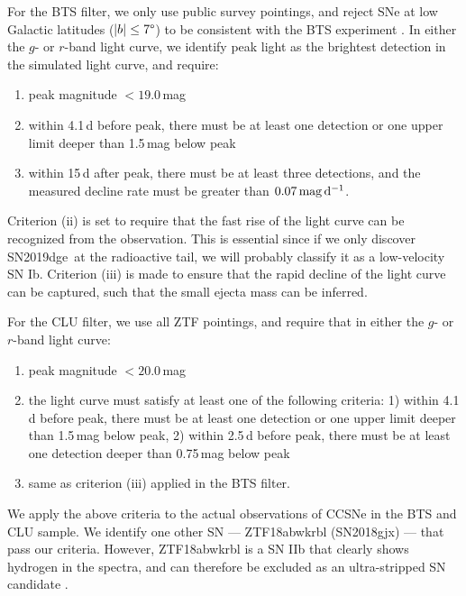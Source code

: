 \documentclass[twocolumn]{aastex63}
\newcommand{\name}{SN2019dge}
\begin{document}
\begin{CJK*}{UTF8}{gbsn}
For the BTS filter, we only use public survey pointings, and reject SNe at low Galactic latitudes ($|b|\leq 
7 \degree$) to be consistent with the BTS experiment \citep{FremlingBTS2019}. In either the $g$- or 
$r$-band light curve, we identify peak light as the brightest detection in the simulated light curve, and 
require:
\begin{enumerate}[label=(\roman*)]
	\item peak magnitude $<19.0$\,mag 
	\item within 4.1\,d before peak, there must be at least one detection or one upper limit 
	deeper than 1.5\,mag below peak
	\item within 15\,d after peak, there must be at least three detections, and the measured decline rate 
	must be greater than $0.07\,{\rm mag\,d^{-1}}$.
\end{enumerate}
Criterion (ii) is set to require that the fast rise of the light curve can be recognized from the 
observation. This is essential since if we only discover \name\ at the radioactive tail, we will 
probably classify it as a low-velocity SN Ib. Criterion (iii) is 
made to ensure that the rapid decline of the light curve can be captured, such that the small ejecta 
mass can be inferred.

For the CLU filter, we use all ZTF pointings, and require that in either the $g$- or $r$-band light curve:
\begin{enumerate}[label=(\roman*)]
	\item peak magnitude $<20.0$\,mag 
	\item the light curve must satisfy at least one of the following criteria: 1) within 4.1\,d before peak, 
	there must be at least one detection or one upper limit deeper than 1.5\,mag below peak, 
	2) within 2.5\,d before peak, there must be at least one detection deeper than 0.75\,mag below 
	peak
	\item same as criterion (iii) applied in the BTS filter.
\end{enumerate}
We apply the above criteria to the actual observations of CCSNe in the BTS and CLU sample. We 
identify one other SN --- ZTF18abwkrbl (SN2018gjx) --- that pass our criteria. However, ZTF18abwkrbl 
is a SN IIb that clearly shows hydrogen in the spectra, and can therefore be excluded as an 
ultra-stripped SN candidate \citep{Tauris2015}. 


\end{CJK*}
\end{document}
